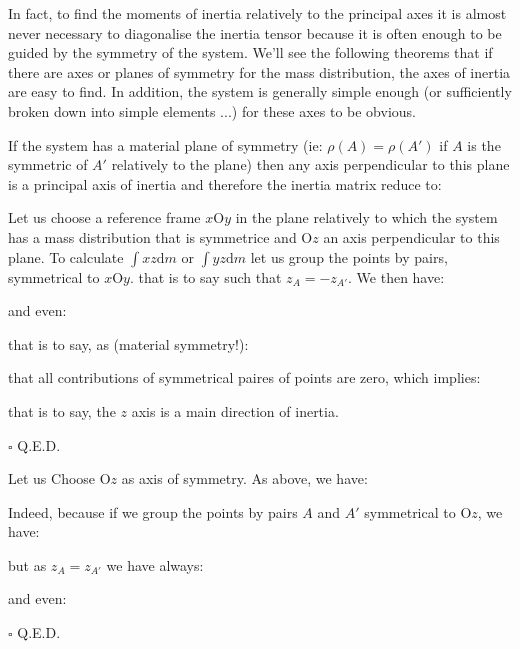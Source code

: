    In fact, to find the moments of inertia relatively to the principal axes it is almost never necessary to diagonalise the inertia tensor because it is often enough to be guided by the symmetry of the system. We'll see the following theorems that if there are axes or planes of symmetry for the mass distribution, the axes of inertia are easy to find. In addition, the system is generally simple enough (or sufficiently broken down into simple elements ...) for these axes to be obvious.
    \begin{theorem}
    If the system has a material plane of symmetry (ie: $\rho(A)=\rho(A')$ if $A$ is the symmetric of $A'$ relatively to the plane) then any axis perpendicular to this plane is a principal axis of inertia and therefore the inertia matrix reduce to:
    
    \end{theorem}
    \begin{dem}
    Let us choose a reference frame $x\text{O}y$ in the plane relatively to which the system has a mass distribution that is symmetrice and O$z$ an axis perpendicular to this plane. To calculate $\int xz\mathrm{d}m$ or $\int yz\mathrm{d}m$ let us group the points by pairs, symmetrical to $x\text{O}y$. that is to say such that $z_A=-z_{A'}$. We then have:
     
      and even:
      
      that is to say, as (material symmetry!):
      
     that all contributions of symmetrical paires of points are zero, which implies:
    
    that is to say, the $z$ axis is a main direction of inertia.
    \begin{flushright}
		$\square$  Q.E.D.
	\end{flushright}
    \end{dem}
    \begin{theorem}
    Let us Choose O$z$ as axis of symmetry. As above, we have:
    
    \end{theorem}
    \begin{dem}
    Indeed, because if we group the points by pairs $A$ and $A'$ symmetrical to O$z$, we have:
    
    but as $z_A=z_{A'}$ we have always:
    
     and even:
     
    \begin{flushright}
		$\square$  Q.E.D.
	\end{flushright} 
    \end{dem}
